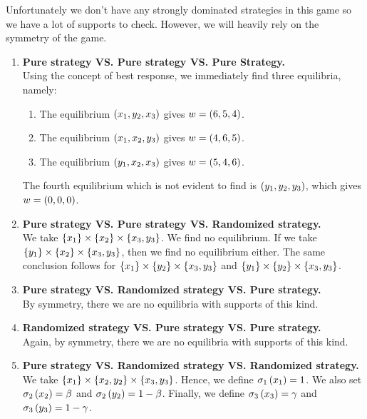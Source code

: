 Unfortunately we don't have any strongly dominated strategies in this game so we have a lot of supports to check.
However, we will heavily rely on the symmetry of the game.

\begin{enumerate} [label=\Alph*. ]
	\item \textbf{Pure strategy VS. Pure strategy VS. Pure Strategy.} \\
	      Using the concept of best response, we immediately find three equilibria, namely:
	      \begin{enumerate}
	      	\item The equilibrium $\left(x_1, y_2, x_3\right)$ gives $w = \left(6,5,4\right)$.
	      	\item The equilibrium $\left(x_1, x_2, y_3\right)$ gives $w = \left(4,6,5\right)$.
	      	\item The equilibrium $\left(y_1, x_2, x_3\right)$ gives $w = \left(5,4,6\right)$.
	      \end{enumerate}
	      	        
	      The fourth equilibrium which is not evident to find is $\left(y_1, y_2, y_3\right)$, which gives $w = \left(0,0,0\right)$.
	      	        
	\item \textbf{Pure strategy VS. Pure strategy VS. Randomized strategy.} \\
	      We take $\left\{x_1\right\} \times \left\{x_2\right\} \times \left\{x_3, y_3\right\}$. We find no equilibrium.
	      If we take $\left\{y_1\right\} \times \left\{x_2\right\} \times \left\{x_3, y_3\right\}$, then we find no equilibrium either.
	      The same conclusion follows for $\left\{x_1\right\} \times \left\{y_2\right\} \times \left\{x_3, y_3\right\}$
	      and $\left\{y_1\right\} \times \left\{y_2\right\} \times \left\{x_3, y_3\right\}$.
	      	          
	\item \textbf{Pure strategy VS. Randomized strategy VS. Pure strategy.} \\
	      By symmetry, there we are no equilibria with supports of this kind.
	      	      
	\item \textbf{Randomized strategy VS. Pure strategy VS. Pure strategy.} \\
	      Again, by symmetry, there we are no equilibria with supports of this kind.
	      	        
	\item \textbf{Pure strategy VS. Randomized strategy VS. Randomized strategy.} \\
	      We take $\left\{x_1\right\} \times \left\{x_2, y_2\right\} \times \left\{x_3, y_3\right\}$.
	      Hence, we define $\sigma_{1} \left(x_1\right) = 1$.
	      We also set $\sigma_{2} \left(x_2\right) = \beta$ and $\sigma_{2} \left(y_2\right) = 1 - \beta$.
	      Finally, we define $\sigma_{3} \left(x_3\right) = \gamma$ and $\sigma_{3} \left(y_3\right) = 1 - \gamma$.
	      	              

\end{enumerate}
